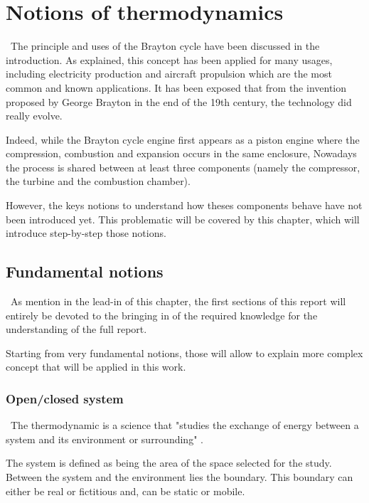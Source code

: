 \graphicspath{{Chapitre_2/Images/}}
\chapter{Notions of thermodynamics}\label{C2}
\quad\, The principle and uses of the Brayton cycle have been discussed in the introduction. As explained, this concept has been applied for many usages, including electricity production and aircraft propulsion which are the most common and known applications. It has been exposed that from the invention proposed by George Brayton in the end of the 19th century, the technology did really evolve.

Indeed, while the Brayton cycle engine first appears as a  piston engine where the compression, combustion and expansion occurs in the same enclosure, Nowadays 
the process is shared between at least three components (namely the compressor, the turbine and the combustion chamber).

However, the keys notions to understand how theses components behave have not been introduced yet. This problematic will be covered by this chapter, which will introduce step-by-step those notions.

\section{Fundamental notions}
\quad\, As mention in the lead-in of this chapter, the first sections of this report will entirely be devoted to the bringing in of the required knowledge for the understanding of the full report.

Starting from very fundamental notions, those will allow to explain more complex concept that will be applied in this work.

\subsection{Open/closed system}\label{sect:C2_Sys}
\quad\,  The thermodynamic is a science that "studies the exchange of energy between a system and its environment or surrounding" \cite{thermoApp_1}.

The system is defined as being the area of the space selected for the study. Between the system and the environment lies the boundary. This boundary can either be real or fictitious and, can be static or mobile.

